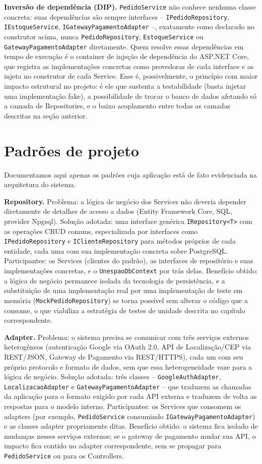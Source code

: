 \documentclass[a4paper,12pt,oneside,openany]{book}
\begin{document}
\textbf{Inversão de dependência (DIP).} \texttt{PedidoService} não conhece nenhuma classe concreta: suas dependências são sempre interfaces -- \texttt{IPedidoRepository}, \texttt{IEstoqueService}, \texttt{IGatewayPagamentoAdapter} --, exatamente como declarado no construtor acima, nunca \texttt{PedidoRepository}, \texttt{EstoqueService} ou \texttt{GatewayPagamentoAdapter} diretamente. Quem resolve essas dependências em tempo de execução é o container de injeção de dependência do ASP.NET Core, que registra as implementações concretas como provedoras de cada interface e as injeta no construtor de cada Service. Esse é, possivelmente, o princípio com maior impacto estrutural no projeto: é ele que sustenta a testabilidade (basta injetar uma implementação fake), a possibilidade de trocar o banco de dados afetando só a camada de Repositories, e o baixo acoplamento entre todas as camadas descritas na seção anterior.

\section{Padrões de projeto}

Documentamos aqui apenas os padrões cuja aplicação está de fato evidenciada na arquitetura do sistema.

\textbf{Repository.} Problema: a lógica de negócio dos Services não deveria depender diretamente de detalhes de acesso a dados (Entity Framework Core, SQL, provider Npgsql). Solução adotada: uma interface genérica \texttt{IRepository<T>} com as operações CRUD comuns, especializada por interfaces como \texttt{IPedidoRepository} e \texttt{IClienteRepository} para métodos próprios de cada entidade, cada uma com sua implementação concreta sobre PostgreSQL. Participantes: os Services (clientes do padrão), as interfaces de repositório e suas implementações concretas, e o \texttt{UnespaoDbContext} por trás delas. Benefício obtido: a lógica de negócio permanece isolada da tecnologia de persistência, e a substituição de uma implementação real por uma implementação de teste em memória (\texttt{MockPedidoRepository}) se torna possível sem alterar o código que a consome, o que viabiliza a estratégia de testes de unidade descrita no capítulo correspondente.

\textbf{Adapter.} Problema: o sistema precisa se comunicar com três serviços externos heterogêneos (autenticação Google via OAuth 2.0, API de Localização/CEP via REST/JSON, Gateway de Pagamento via REST/HTTPS), cada um com seu próprio protocolo e formato de dados, sem que essa heterogeneidade vaze para a lógica de negócio. Solução adotada: três classes -- \texttt{GoogleAuthAdapter}, \texttt{LocalizacaoAdapter} e \texttt{GatewayPagamentoAdapter} -- que traduzem as chamadas da aplicação para o formato exigido por cada API externa e traduzem de volta as respostas para o modelo interno. Participantes: os Services que consomem os adapters (por exemplo, \texttt{PedidoService} consumindo \texttt{IGatewayPagamentoAdapter}) e as classes adapter propriamente ditas. Benefício obtido: o sistema fica isolado de mudanças nesses serviços externos; se o gateway de pagamento mudar sua API, o impacto fica contido no adapter correspondente, sem se propagar para \texttt{PedidoService} ou para os Controllers.
\end{document}
